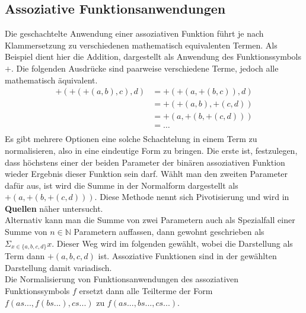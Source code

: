 \documentclass{article}
\begin{document}
\subsection {Assoziative Funktionsanwendungen}
Die geschachtelte Anwendung einer assoziativen Funktion führt je nach Klammersetzung zu verschiedenen mathematisch equivalenten Termen. Als Beispiel dient hier die Addition, dargestellt als Anwendung des Funktionssymbols $+$. Die folgenden Ausdrücke sind paarweise verschiedene Terme, jedoch alle mathematisch äquivalent.
\begin{equation}
	\begin{split}
	+(+(+(a, b), c), d) &= +(+(a, +(b, c)), d)\\
	&= +(+(a, b), +(c, d))\\
	&= +(a, +(b, +(c, d)))\\
	&= \dots \\
	\end{split}
\end{equation}
Es gibt mehrere Optionen eine solche Schachtelung in einem Term zu normalisieren, also in eine eindeutige Form zu bringen. Die erste ist, festzulegen, dass höchstens einer der beiden Parameter der binären assoziativen Funktion wieder Ergebnis dieser Funktion sein darf. Wählt man den zweiten Parameter dafür aus, ist wird die Summe in der Normalform dargestellt als $+(a, +(b, +(c, d)))$. Diese Methode nennt sich Pivotisierung und wird in \textbf{Quellen} näher untersucht.\\
Alternativ kann man die Summe von zwei Parametern auch als Spezialfall einer Summe von $n \in \mathbb{N}$ Parametern auffassen, dann gewohnt geschrieben als $\Sigma_{x \in \{a, b, c, d\}} x$. Dieser Weg wird im folgenden gewählt, wobei die Darstellung als Term dann $+(a, b, c, d)$ ist. Assoziative Funktionen sind in der gewählten Darstellung damit variadisch. \\
Die Normalisierung von Funktionsanwendungen des assoziativen Funktionssymbols $f$ ersetzt dann alle Teilterme der Form $f(as..., f(bs...), cs...)$ zu $f(as..., bs..., cs...)$.
\end{document}
